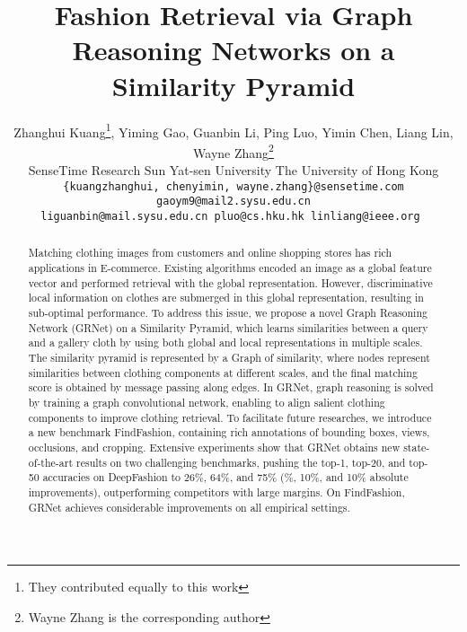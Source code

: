 \documentclass[10pt,twocolumn,letterpaper]{article}
\begin{document}
\title{Fashion Retrieval via Graph Reasoning Networks on a Similarity Pyramid}

\author{
Zhanghui Kuang\thanks{They contributed equally to this work},\hspace{1px} Yiming Gao,\hspace{1px} Guanbin Li,\hspace{1px} Ping Luo,\hspace{1px} Yimin Chen,\hspace{1px} Liang Lin,\hspace{1px} Wayne Zhang\thanks{Wayne Zhang is the corresponding author}\\
SenseTime Research \hspace{3px} Sun Yat-sen University \hspace{3px} The University of Hong Kong\\
\tt\small \{kuangzhanghui, chenyimin,  wayne.zhang\}@sensetime.com \hspace{2px} gaoym9@mail2.sysu.edu.cn \hspace{2px} \\
\tt\small liguanbin@mail.sysu.edu.cn \hspace{2px} pluo@cs.hku.hk \hspace{2px} linliang@ieee.org
}
\maketitle
\thispagestyle{empty}


\begin{abstract}
 Matching clothing images from customers and online shopping stores has rich applications in E-commerce. Existing algorithms encoded an image as a global feature vector and performed retrieval with the global representation. However, discriminative local information on clothes are submerged in this global representation, resulting in sub-optimal performance.
 To address this issue, we propose a novel Graph Reasoning Network (GRNet) on a Similarity Pyramid, which learns similarities between a query and a gallery cloth by using both global and local representations in multiple scales.
  The similarity pyramid is represented by a Graph of similarity, where nodes represent similarities between clothing components at different scales, and the final matching score is obtained by message passing along edges. In GRNet, graph reasoning is solved by training a graph convolutional network, enabling to align salient clothing components to improve clothing retrieval.
  To facilitate future researches,
  we introduce a new benchmark FindFashion, containing rich annotations of bounding boxes, views, occlusions, and cropping.
  Extensive experiments show that GRNet obtains new state-of-the-art results on two challenging benchmarks, \eg pushing the top-1, top-20, and top-50 accuracies on DeepFashion to 26\%, 64\%, and 75\% (\%, 10\%, and 10\% absolute improvements), outperforming competitors with large margins. On FindFashion, GRNet achieves considerable improvements on all empirical settings.
 \end{abstract}
\end{document}
